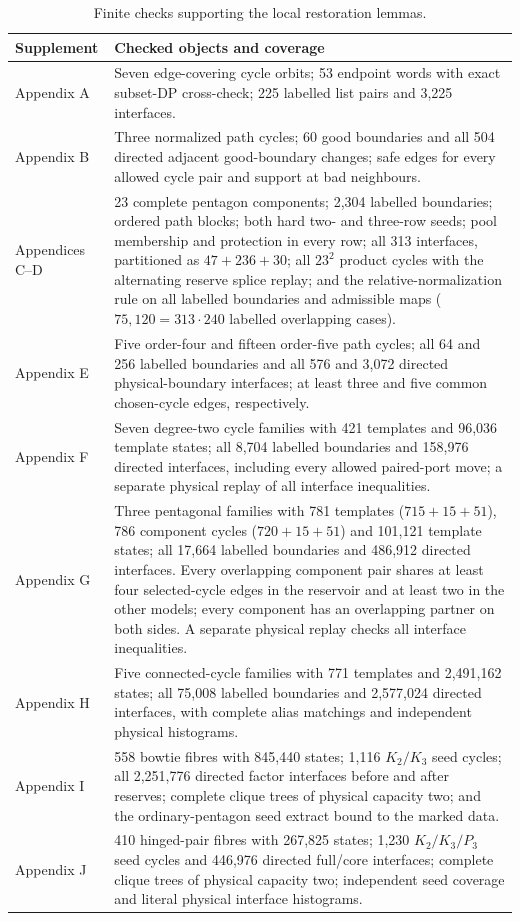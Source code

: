 \documentclass[11pt]{article}
\theoremstyle{remark}
\numberwithin{equation}{section}
\numberwithin{table}{section}
\begin{document}
\begin{table}[htbp]
\centering\small
\caption{Finite checks supporting the local restoration lemmas.}
\label{tab:verification}
\begin{tabularx}{\linewidth}{@{}lX@{}}
\toprule
Supplement & Checked objects and coverage\\
\midrule
Appendix A & Seven edge-covering cycle orbits; 53 endpoint words with
exact subset-DP cross-check; 225 labelled list pairs and 3,225 interfaces.\\
Appendix B & Three normalized path cycles; 60 good boundaries and all
504 directed adjacent good-boundary changes; safe edges for every
allowed cycle pair and support at bad neighbours.\\
Appendices C--D & 23 complete pentagon components; 2,304 labelled
boundaries; ordered path blocks; both hard two- and three-row seeds;
pool membership and protection in every row; all 313 interfaces,
partitioned as $47+236+30$; all $23^2$ product cycles with the
alternating reserve splice replay; and the relative-normalization rule
on all labelled boundaries and admissible maps
($75{,}120=313\mathbin\cdot240$ labelled overlapping cases).\\
Appendix E & Five order-four and fifteen order-five path cycles;
all 64 and 256 labelled boundaries and all 576 and 3,072 directed
physical-boundary interfaces; at least three and five common chosen-cycle
edges, respectively.\\
Appendix F & Seven degree-two cycle families with 421 templates and
96,036 template states; all 8,704 labelled boundaries and 158,976 directed
interfaces, including every allowed paired-port move; a separate physical
replay of all interface inequalities.\\
Appendix G & Three pentagonal families with 781 templates
($715+15+51$), 786 component cycles ($720+15+51$) and 101,121 template
states; all 17,664 labelled boundaries and
486,912 directed interfaces. Every overlapping component pair shares at
least four selected-cycle edges in the reservoir and at least two in the
other models; every component has an overlapping partner on both sides.
A separate physical replay checks all interface inequalities.\\
Appendix H & Five connected-cycle families with 771 templates and
2,491,162 states; all 75,008 labelled boundaries and 2,577,024 directed
interfaces, with complete alias matchings and independent physical
histograms.\\
Appendix I & 558 bowtie fibres with 845,440 states; 1,116 $K_2/K_3$
seed cycles; all 2,251,776 directed factor interfaces before and after
reserves; complete clique trees of physical capacity two; and the
ordinary-pentagon seed extract bound to the marked data.\\
Appendix J & 410 hinged-pair fibres with 267,825 states; 1,230
$K_2/K_3/P_3$ seed cycles and 446,976 directed full/core interfaces;
complete clique trees of physical capacity two; independent seed
coverage and literal physical interface histograms.\\
\bottomrule
\end{tabularx}
\end{table}
\end{document}

